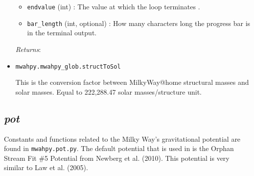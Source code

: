 \documentclass{article}
\begin{document}
\begin{itemize}
\begin{itemize}
\item \verb!endvalue! (int) : The value at which the loop terminates .

\item \verb!bar_length! (int, optional) : How many characters long the progress bar is in the terminal output.

\end{itemize}

\textit{Returns}:



\item \verb!mwahpy.mwahpy_glob.structToSol!

This is the conversion factor between MilkyWay@home structural masses and solar masses. Equal to 222,288.47 solar masses/structure unit.

\end{itemize} 

\subsection{\textit{pot}}

Constants and functions related to the Milky Way's gravitational potential are found in \verb!mwahpy.pot.py!. The default potential that is used in \mwahpy is the Orphan Stream Fit \#5 Potential from Newberg et al. (2010). This potential is very similar to Law et al. (2005). 
\end{document}
